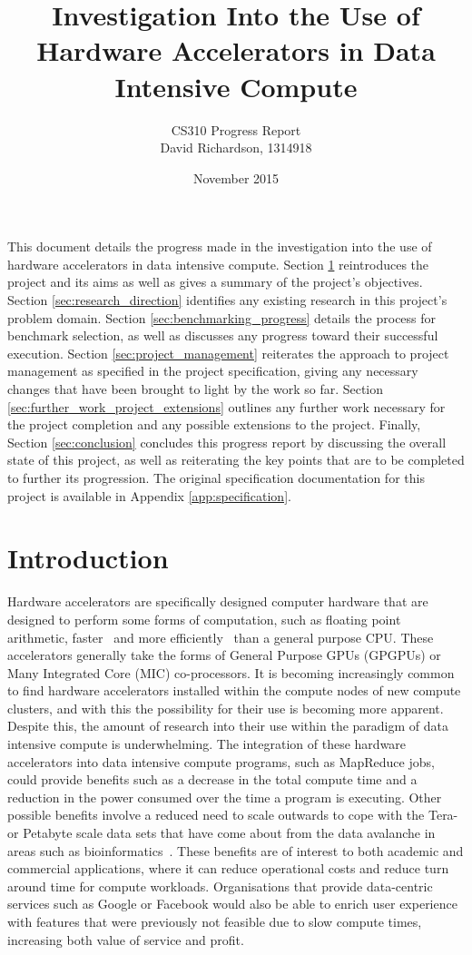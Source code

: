 \documentclass[12pt,a4paper]{article}
\title{Investigation Into the Use of Hardware Accelerators in Data Intensive Compute}
\author{CS310 Progress Report\\David Richardson, 1314918}
\date{November 2015}
\begin{document}
	\maketitle
	
	This document details the progress made in the investigation into the use of hardware accelerators in data intensive compute. Section \ref{sec:introduction} reintroduces the project and its aims as well as gives a summary of the project's objectives. Section \ref{sec:research_direction} identifies any existing research in this project's problem domain. Section \ref{sec:benchmarking_progress} details the process for benchmark selection, as well as discusses any progress toward their successful execution. Section \ref{sec:project_management} reiterates the approach to project management as specified in the project specification, giving any necessary changes that have been brought to light by the work so far. Section \ref{sec:further_work_project_extensions} outlines any further work necessary for the project completion and any possible extensions to the project. Finally, Section \ref{sec:conclusion} concludes this progress report by discussing the overall state of this project, as well as reiterating the key points that are to be completed to further its progression. The original specification documentation for this project is available in Appendix \ref{app:specification}.

	\section{Introduction}
	\label{sec:introduction}

        Hardware accelerators are specifically designed computer hardware that are designed to perform some forms of computation, such as floating point arithmetic, faster~\cite{accelerating-matrix-product, quantitative-finance-gpu} and more efficiently~\cite{energy-efficient-gpu} than a general purpose CPU. These accelerators generally take the forms of General Purpose GPUs (GPGPUs) or Many Integrated Core (MIC) co-processors. It is becoming increasingly common to find hardware accelerators installed within the compute nodes of new compute clusters, and with this the possibility for their use is becoming more apparent. Despite this, the amount of research into their use within the paradigm of data intensive compute is underwhelming. The integration of these hardware accelerators into data intensive compute programs, such as MapReduce jobs, could provide benefits such as a decrease in the total compute time and a reduction in the power consumed over the time a program is executing. Other possible benefits involve a reduced need to scale outwards to cope with the Tera- or Petabyte scale data sets that have come about from the data avalanche in areas such as bioinformatics~\cite{big-data-biocuration}. These benefits are of interest to both academic and commercial applications, where it can reduce operational costs and reduce turn around time for compute workloads. Organisations that provide data-centric services such as Google or Facebook would also be able to enrich user experience with features that were previously not feasible due to slow compute times, increasing both value of service and profit.
	
\end{document}
